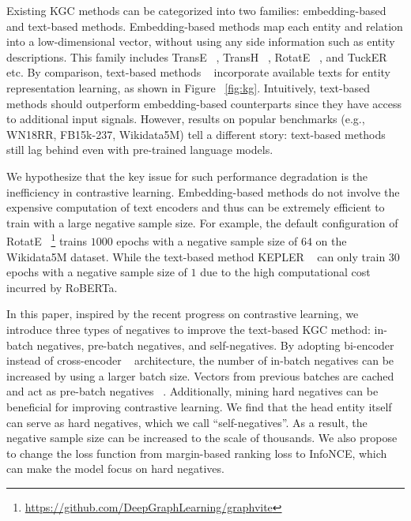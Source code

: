 \documentclass[11pt]{article}
\begin{document}
Existing KGC methods can be categorized into two families:
embedding-based and text-based methods.
Embedding-based methods map each entity and relation into a low-dimensional vector,
without using any side information such as entity descriptions.
This family includes TransE ~\citep{bordes2013translating}, TransH ~\citep{wang2014knowledge},
RotatE ~\citep{sun2018rotate}, and TuckER ~\citep{balazevic-etal-2019-tucker} etc.
By comparison,
text-based methods ~\citep{yao2019kg,xie2016representation,wang2021kepler}
incorporate available texts for entity representation learning,
as shown in Figure ~\ref{fig:kg}.
Intuitively,
text-based methods should outperform embedding-based counterparts
since they have access to additional input signals.
However,
results on popular benchmarks (e.g., WN18RR, FB15k-237, Wikidata5M)
tell a different story:
text-based methods still lag behind even with pre-trained language models.

We hypothesize that the key issue for such performance degradation
is the inefficiency in contrastive learning.
Embedding-based methods do not involve the expensive computation of text encoders
and thus can be extremely efficient to train with a large negative sample size.
For example,
the default configuration of RotatE ~\footnote{\url{https://github.com/DeepGraphLearning/graphvite}}
trains $1000$ epochs with a negative sample size of $64$ on the Wikidata5M dataset.
While the text-based method KEPLER ~\citep{wang2021kepler}
can only train $30$ epochs with a negative sample size of $1$
due to the high computational cost incurred by RoBERTa.

In this paper,
inspired by the recent progress on contrastive learning,
we introduce three types of negatives to improve the text-based KGC method:
in-batch negatives,
pre-batch negatives,
and self-negatives.
By adopting bi-encoder instead of cross-encoder ~\citep{yao2019kg} architecture,
the number of in-batch negatives can be increased by using a larger batch size.
Vectors from previous batches are cached and act as pre-batch negatives ~\citep{karpukhin-etal-2020-dense}.
Additionally,
mining hard negatives can be beneficial for improving contrastive learning.
We find that the head entity itself can serve as hard negatives,
which we call ``self-negatives''.
As a result,
the negative sample size can be increased to the scale of thousands.
We also propose to change the loss function from margin-based ranking loss to InfoNCE,
which can make the model focus on hard negatives.
\end{document}
